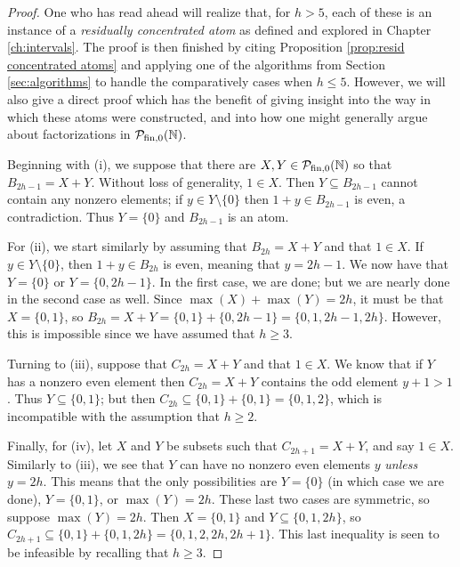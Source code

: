 \begin{proof}
	One who has read ahead will realize that, for $h > 5$, each of these is an instance of a \textit{residually concentrated atom} as defined and explored in Chapter \ref{ch:intervals}.  
	The proof is then finished by citing Proposition \ref{prop:resid concentrated atoms} and applying one of the algorithms from Section \ref{sec:algorithms} to handle the comparatively cases when $h\le 5$.
	However, we will also give a direct proof which has the benefit of giving insight into the way in which these atoms were constructed, and into how one might generally argue about factorizations in ${\mathcal{P}_{\textrm{fin},0}(\mathbb{N})}$.
	
	Beginning with (i), we suppose that there are $X,Y\in {\mathcal{P}_{\textrm{fin},0}(\mathbb{N})}$ so that $B_{2h-1} = X + Y$.
	Without loss of generality, $1\in X$.
	Then $Y\subseteq B_{2h-1}$ cannot contain any nonzero elements; if $y\in Y\setminus\{0\}$ then $1+y\in B_{2h-1}$ is even, a contradiction.
	Thus $Y = \{0\}$ and $B_{2h-1}$ is an atom.
	
	For (ii), we start similarly by assuming that $B_{2h} = X + Y$ and that $1\in X$.
	If $y\in Y \setminus\{0\}$, then $1+y\in B_{2h}$ is even, meaning that $y = 2h-1$.
	We now have that $Y = \{0\}$ or $Y = \{0,2h-1\}$.
	In the first case, we are done; but we are nearly done in the second case as well.  
	Since $\max(X) + \max(Y) = 2h$, it must be that $X = \{0,1\}$, so $B_{2h} = X+Y = \{0,1\} + \{0,2h-1\} = \{0,1,2h-1,2h\}$.
	However, this is impossible since we have assumed that $h\ge 3$.
	
	Turning to (iii), suppose that $C_{2h} = X + Y$ and that $1\in X$.
	We know that if $Y$ has a nonzero even element then $C_{2h} = X + Y$ contains the odd element $y+1 > 1$.
	Thus $Y \subseteq \{0,1\}$; but then $C_{2h} \subseteq \{0,1\} + \{0,1\} = \{0,1,2\}$, which is incompatible with the assumption that $h\ge 2$.
	
	Finally, for (iv), let $X$ and $Y$ be subsets such that $C_{2h+1} = X + Y$, and say $1\in X$.
	Similarly to (iii), we see that $Y$ can have no nonzero even elements $y$ \textit{unless} $y=2h$.
	This means that the only possibilities are $Y = \{0\}$ (in which case we are done), $Y = \{0,1\}$, or $\max(Y) = 2h$.
	These last two cases are symmetric, so suppose $\max(Y) = 2h$.
	Then $X = \{0,1\}$ and $Y \subseteq \{0,1,2h\}$, so $C_{2h+1} \subseteq \{0,1\} + \{0,1,2h\} = \{0,1,2,2h,2h+1\}$.
	This last inequality is seen to be infeasible by recalling that $h\ge 3$.
\end{proof}

